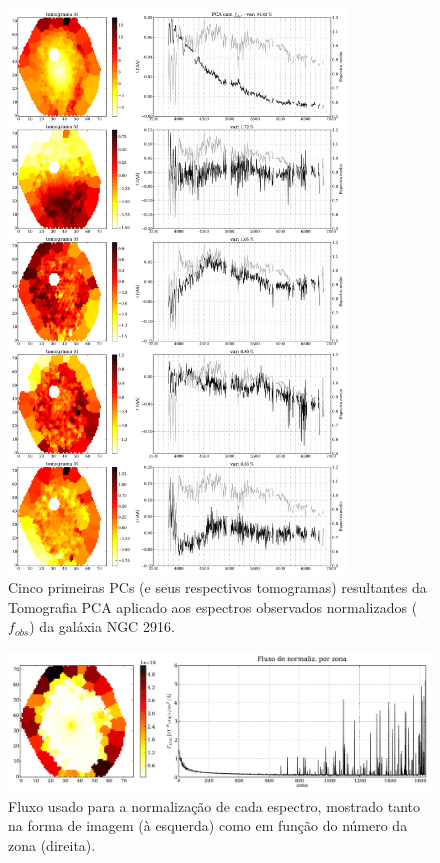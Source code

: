 \begin{figure}
    \includegraphics[width=0.8\textwidth]{figuras/K0277-tomo-obs-norm.pdf}
    \caption[Tomogramas de 1 a 5 da gal\'axia NGC 2916 - $f_{obs}$.]
    {Cinco primeiras PCs (e seus respectivos tomogramas) resultantes da Tomografia PCA aplicado aos espectros observados
    normalizados ($f_{obs}$) da galáxia NGC 2916.}
    \label{fig:K0277tomofobsnorm}
\end{figure}

\begin{figure}
    \includegraphics[width=1.\textwidth]{figuras/K0277-fobs_norm.pdf}
    \caption[Fluxos de normalização para cada zona da galáxia K0277.]
    {Fluxo usado para a normalização de cada espectro, mostrado tanto na forma de imagem (à esquerda) como em função do
    número da zona (direita).}
    \label{fig:K0277fobsnorm}
\end{figure}

